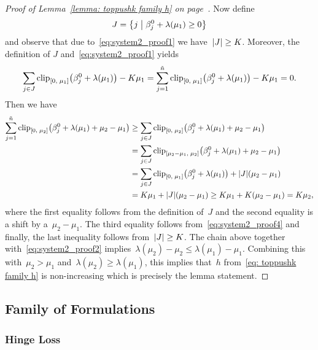 \begin{proof}[Proof of Lemma~\ref{lemma: toppushk family h} on page~\pageref{lemma: toppushk family h}]
  Now define
  \begin{equation*}
    J = \Set{j}{\beta_j^0 + \lambda(\mu_1) \ge 0}
  \end{equation*}
  and observe that due to~\eqref{eq:system2_proof1} we have~$|J| \ge K$. Moreover, the definition of $J$ and~\eqref{eq:system2_proof1} yields
  \begin{equation}\label{eq:system2_proof4}
    \sum_{j \in J} \clip{0}{\mu_1}{\beta_j^0 + \lambda(\mu_1)} - K\mu_1
      = \sum_{j=1}^{\ntil} \clip{0}{\mu_1}{\beta_j^0 + \lambda(\mu_1)} - K\mu_1
      = 0.
  \end{equation}
  Then we have
  \begin{align*}
    \sum_{j=1}^{\ntil} \clip{0}{\mu_2}{\beta_j^0 + \lambda(\mu_1) + \mu_2 - \mu_1}
      & \ge \sum_{j \in J} \clip{0}{\mu_2}{\beta_j^0 + \lambda(\mu_1) + \mu_2 - \mu_1} \\
      &  = \sum_{j \in J} \clip{\mu_2 - \mu_1}{\mu_2}{\beta_j^0 + \lambda(\mu_1) + \mu_2 - \mu_1} \\
      & = \sum_{j \in J} \clip{0}{\mu_1}{\beta_j^0 + \lambda(\mu_1)} + \abs{J}(\mu_2 - \mu_1) \\
      &  = K\mu_1 + \abs{J}(\mu_2 - \mu_1)
      \ge K\mu_1 + K(\mu_2 - \mu_1)
      = K\mu_2,
  \end{align*}
  where the first equality follows from the definition of~$J$ and the second equality is a shift by a~$\mu_2- \mu_1.$ The third equality follows from~\eqref{eq:system2_proof4} and finally, the last inequality follows from~$|J| \ge K$. The chain above together with~\eqref{eq:system2_proof2} implies~$\lambda(\mu_2) - \mu_2 \le \lambda(\mu_1)- \mu_1$. Combining this with~$\mu_2 > \mu_1$ and~$\lambda(\mu_2) \ge \lambda(\mu_1)$, this implies that~$h$ from~\eqref{eq: toppushk family h} is non-increasing which is precisely the lemma statement.
\end{proof}

\subsection{Family of \PatMat Formulations}\label{sec: patmat family coordinate proofs}
\subsubsection{Hinge Loss}

